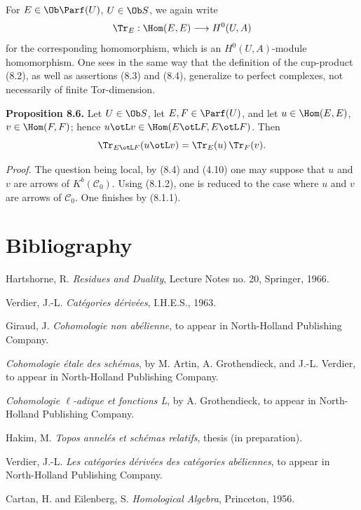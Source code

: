 For \(E\in\Ob\Parf(U)\), \(U\in\Ob S\), we again write
\[
  \Tr_E:\Hom(E,E)\longrightarrow H^0(U,A)
\]
for the corresponding homomorphism, which is an \(H^0(U,A)\)-module homomorphism. One sees in the same way that the definition of the cup-product (8.2), as well as assertions (8.3) and (8.4), generalize to perfect complexes, not necessarily of finite Tor-dimension.

\textbf{Proposition 8.6.} Let \(U\in\Ob S\), let \(E,F\in\Parf(U)\), and let \(u\in\Hom(E,E)\), \(v\in\Hom(F,F)\); hence \(u\otL v\in\Hom(E\otL F,E\otL F)\). Then
\[
  \Tr_{E\otL F}(u\otL v)=\Tr_E(u)\,\Tr_F(v).
\]

\emph{Proof.} The question being local, by (8.4) and (4.10) one may suppose that \(u\) and \(v\) are arrows of \(K^b(\mathcal C_0)\). Using (8.1.2), one is reduced to the case where \(u\) and \(v\) are arrows of \(\mathcal C_0\). One finishes by (8.1.1).

\section*{Bibliography}
\begin{description}[leftmargin=2.5cm,style=nextline]
\item[{[H]}] Hartshorne, R. \emph{Residues and Duality}, Lecture Notes no. 20, Springer, 1966.
\item[{[V]}] Verdier, J.-L. \emph{Catégories dérivées}, I.H.E.S., 1963.
\item[{[G]}] Giraud, J. \emph{Cohomologie non abélienne}, to appear in North-Holland Publishing Company.
\item[{SGA 4}] \emph{Cohomologie étale des schémas}, by M. Artin, A. Grothendieck, and J.-L. Verdier, to appear in North-Holland Publishing Company.
\item[{SGA 5}] \emph{Cohomologie \(\ell\)-adique et fonctions L}, by A. Grothendieck, to appear in North-Holland Publishing Company.
\item[{[1]}] Hakim, M. \emph{Topos annelés et schémas relatifs}, thesis (in preparation).
\item[{[2]}] Verdier, J.-L. \emph{Les catégories dérivées des catégories abéliennes}, to appear in North-Holland Publishing Company.
\item[{[MUL]}] Cartan, H. and Eilenberg, S. \emph{Homological Algebra}, Princeton, 1956.
\end{description}



